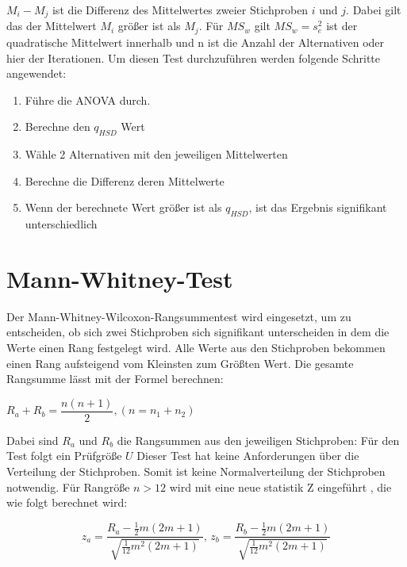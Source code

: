 $M_i - M_j$ ist die Differenz des Mittelwertes zweier Stichproben $i$ und $j$.
Dabei gilt das der Mittelwert $M_i$ größer ist als $M_j$.
Für $MS_w$ gilt $MS_w = s^2_{e}$ ist der quadratische Mittelwert innerhalb und n ist die Anzahl
der Alternativen oder hier der Iterationen.
Um diesen Test durchzuführen werden folgende Schritte angewendet:

\begin{center}
  \begin{enumerate}
    \item Führe die ANOVA durch. 
    \item Berechne den $q_{HSD}$ Wert
    \item Wähle 2 Alternativen mit den jeweiligen Mittelwerten
    \item Berechne die Differenz deren Mittelwerte
    \item Wenn der berechnete Wert größer ist als $q_{HSD}$, ist das Ergebnis signifikant unterschiedlich 
  \end{enumerate}
\end{center}


\section{Mann-Whitney-Test}
Der Mann-Whitney-Wilcoxon-Rangsummentest \cite{statistik_sozialwissenschaften} \cite{u_test}
wird eingesetzt, um zu entscheiden, ob sich zwei
Stichproben sich signifikant unterscheiden in dem die Werte einen Rang festgelegt wird. 
Alle Werte aus den Stichproben bekommen einen Rang aufsteigend vom Kleinsten zum Größten Wert.
Die gesamte Rangsumme lässt mit der Formel berechnen:
\begin{center}
  $R_a + R_b = \dfrac{n(n + 1)}{2}, (n = n_1 + n_2)$
\end{center}  

Dabei sind $R_a$ und $R_b$ die Rangsummen aus den jeweiligen Stichproben:
Für den Test folgt ein Prüfgröße $U$  
Dieser Test
hat keine Anforderungen über die Verteilung der Stichproben.
Somit ist keine Normalverteilung der Stichproben notwendig.
Für Rangröße $n > 12$ wird mit eine neue statistik Z eingeführt , die wie folgt berechnet wird:

\begin{center}
  \[
    z_{a} = \frac{R_{a} - \frac{1}{2}m(2m+1)}{\sqrt{\frac{1}{12}m^2(2m+1)}} \text{, }
    z_{b} = \frac{R_{b} - \frac{1}{2}m(2m+1)}{\sqrt{\frac{1}{12}m^2(2m+1)}}
  \]
\end{center}

